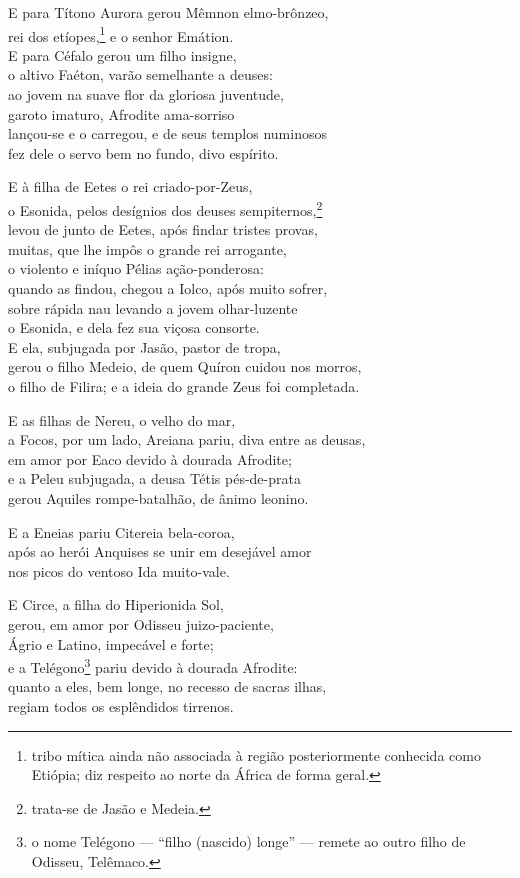 \quad{}E para Títono Aurora gerou Mêmnon elmo-brônzeo,\\
rei dos etíopes,\footnote{tribo mítica ainda não associada à região
posteriormente conhecida como Etiópia; diz respeito ao norte da África
de forma geral.} e o senhor Emátion. \\
E para Céfalo gerou um filho insigne,\\
o altivo Faéton, varão semelhante a deuses:\\
ao jovem na suave flor da gloriosa juventude,\\
garoto imaturo, Afrodite ama-sorriso\\
lançou-se e o carregou, e de seus templos numinosos \\
fez dele o servo bem no fundo, divo espírito.

\quad{}E à filha de Eetes o rei criado-por-Zeus,\\
o Esonida, pelos desígnios dos deuses sempiternos,\footnote{trata-se de Jasão e Medeia.}\\
levou de junto de Eetes, após findar tristes provas,\\
muitas, que lhe impôs o grande rei arrogante, \\
o violento e iníquo Pélias ação-ponderosa:\\
quando as findou, chegou a Iolco, após muito sofrer,\\
sobre rápida nau levando a jovem olhar-luzente\\
o Esonida, e dela fez sua viçosa consorte.\\
E ela, subjugada por Jasão, pastor de tropa, \\
gerou o filho Medeio, de quem Quíron cuidou nos morros,\\
o filho de Filira; e a ideia do grande Zeus foi completada.

\quad{}E as filhas de Nereu, o velho do mar,\\
a Focos, por um lado, Areiana pariu, diva entre as deusas,\\
em amor por Eaco devido à dourada Afrodite; \\
e a Peleu subjugada, a deusa Tétis pés-de-prata\\
gerou Aquiles rompe-batalhão, de ânimo leonino.

\quad{}E a Eneias pariu Citereia bela-coroa,\\
após ao herói Anquises se unir em desejável amor\\
nos picos do ventoso Ida muito-vale. 

\quad{}E Circe, a filha do Hiperionida Sol,\\
gerou, em amor por Odisseu juizo-paciente,\\
Ágrio e Latino, impecável e forte;\\
e a Telégono\footnote{o nome Telégono --- ``filho (nascido) longe'' --- remete ao outro filho de Odisseu, Telêmaco.} pariu devido à dourada Afrodite:\\
quanto a eles, bem longe, no recesso de sacras ilhas, \\
regiam todos os esplêndidos tirrenos.

